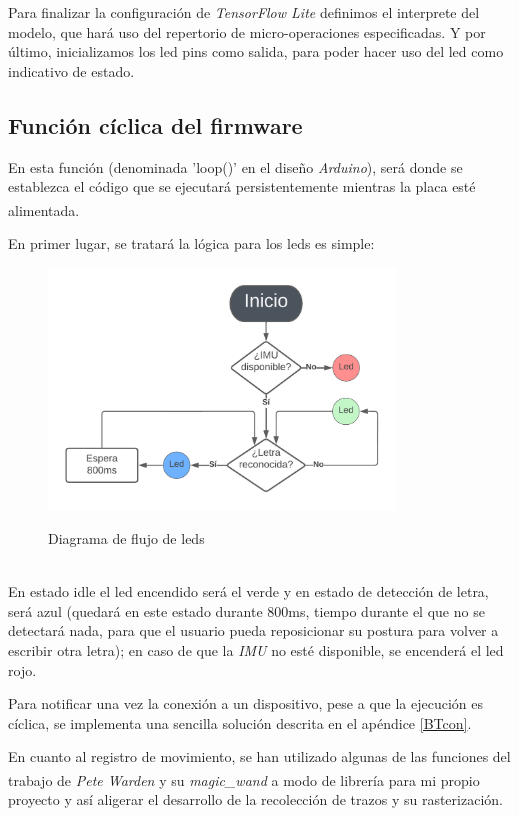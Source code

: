 Para finalizar la configuración de \textit{TensorFlow Lite} definimos el interprete del modelo, que hará
uso del repertorio de micro-operaciones especificadas.\newline
Y por último, inicializamos los led pins como salida, para poder hacer uso
del led como indicativo de estado.

\subsection{Función cíclica del firmware}
En esta función (denominada 'loop()' en el diseño \textit{Arduino}),
será donde se establezca el código que se ejecutará persistentemente
mientras la placa esté alimentada\textsuperscript{\cite{andriyadimw}\cite{petewardenmw}}.

En primer lugar, se tratará la lógica para los leds es simple:
\begin{figure}[h]
    \centering
    \includegraphics[width=0.82\textwidth]{capturas/DiagramaFlujoLeds.png}\\[-0,20cm]
    \caption{Diagrama de flujo de leds}
\end{figure}\\
En estado idle el led
encendido será el verde y en estado de detección de letra, será azul (quedará en este estado
durante 800ms, tiempo durante el que no se detectará nada, para que el usuario pueda
reposicionar su postura para volver a escribir otra letra); en caso de que la \textit{IMU}
no esté disponible, se encenderá el led rojo.

Para notificar una vez la conexión a un dispositivo, pese a que
la ejecución es cíclica, se implementa una sencilla solución descrita en el
apéndice \ref{BTcon}.

En cuanto al registro de movimiento, se han utilizado algunas de las funciones
del trabajo de \textit{Pete Warden} y su \textit{magic\_wand}\textsuperscript{\cite{petewardenmw}}
a modo de librería para mi propio proyecto y así aligerar el desarrollo de
la recolección de trazos y su rasterización.

